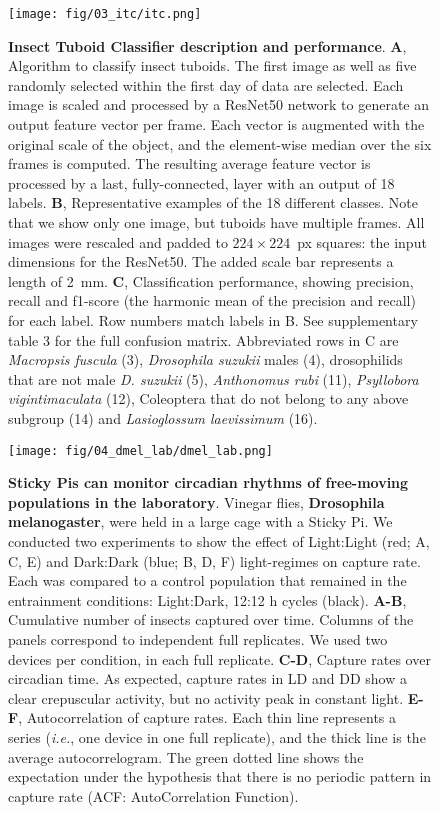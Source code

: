 \documentclass[12pt]{article}
\begin{document}
	\begin{figure}[ht]
		\centering
		\texttt{[image: fig/03\_itc/itc.png]}
		\caption{\textbf{Insect Tuboid Classifier description and performance}. \textbf{A}, Algorithm to classify insect tuboids. The first image as well as five randomly selected within the first day of data are selected. Each image is scaled and processed by a ResNet50 network to generate an output feature vector per frame. Each vector is augmented with the original scale of the object, and the element-wise median over the six frames is computed. The resulting average feature vector is processed by a last, fully-connected, layer with an output of 18 labels. 
		\textbf{B}, Representative examples of the 18 different classes. 
		Note that we show only one image, but tuboids have multiple frames.
        All images were rescaled and padded to $224\times224$~px squares: the input dimensions for the ResNet50.
        The added scale bar represents a length of 2~mm.
		\textbf{C}, Classification performance, showing precision, recall and f1-score (the harmonic mean of the precision and recall) for each label. 
		Row numbers match labels in B. See supplementary table 3 for the full confusion matrix.
		Abbreviated rows in C are \emph{Macropsis fuscula} (3), \emph{Drosophila suzukii} males (4), drosophilids that are not male \emph{D. suzukii} (5), \emph{Anthonomus rubi} (11), \emph{Psyllobora vigintimaculata} (12), Coleoptera that do not belong to any above subgroup (14) and \emph{Lasioglossum laevissimum} (16).
		}
		\label{fig:03}
	\end{figure}
	
	\pagebreak
	
	\begin{figure}[ht]
		\centering
		\texttt{[image: fig/04\_dmel\_lab/dmel\_lab.png]}
		\caption{\textbf{Sticky Pis can monitor circadian rhythms of free-moving populations in the laboratory}. Vinegar flies, \textbf{Drosophila melanogaster}, were held in a large cage with a Sticky Pi. We conducted two experiments to show the effect of Light:Light (red; A, C, E) and Dark:Dark (blue; B, D, F) light-regimes on capture rate. Each was compared to a control population that remained in the entrainment conditions: Light:Dark, 12:12 h cycles (black). \textbf{A-B}, Cumulative number of insects captured over time. Columns of the panels correspond to independent full replicates. We used two devices per condition, in each full replicate. \textbf{C-D}, Capture rates over circadian time. As expected, capture rates in LD and DD show a clear crepuscular activity, but no activity peak in constant light. \textbf{E-F}, Autocorrelation of capture rates. Each thin line represents a series (\emph{i.e.}, one device in one full replicate), and the thick line is the average autocorrelogram. The green dotted line shows the expectation under the hypothesis that there is no periodic pattern in capture rate (ACF: AutoCorrelation Function).
		}
		\label{fig:04}
	\end{figure}
	
\end{document}
